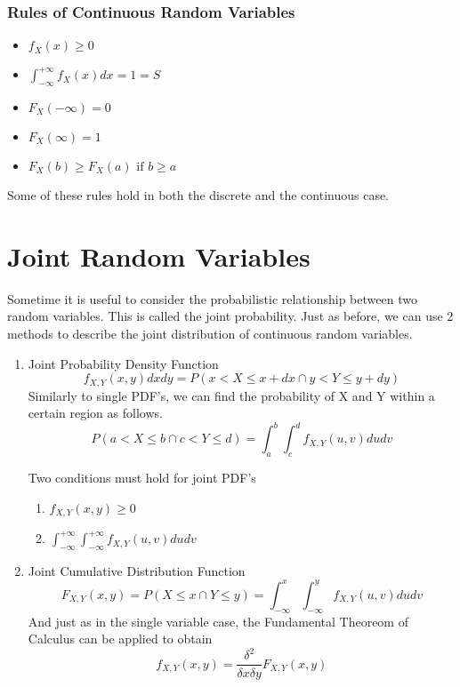 \subsubsection*{Rules of Continuous Random Variables}
\begin{itemize}
    \item $f_X(x) \ge 0$
    \item $\int_{-\infty}^{+\infty}f_X(x)dx = 1 = S$
    \item $F_X(-\infty) = 0$
    \item $F_X({}\infty) = 1$ 
    \item $F_X(b) \ge F_X(a) \text{ if } b \ge a$
\end{itemize}

Some of these rules hold in both the discrete and the continuous case.

\section{Joint Random Variables}

Sometime it is useful to consider the probabilistic relationship between two random variables. This is called the joint probability. Just as before, we can use 2 methods to describe the joint distribution of continuous random variables.
\begin{enumerate}
    \item Joint Probability Density Function
    \[
        f_{X,Y}(x, y)dxdy = P(x < X \le x + dx \cap y < Y \le y + dy) 
    \]
    Similarly to single PDF's, we can find the probability of X and Y within a certain region as follows.
    \[
        P(a < X \le b \cap c < Y \le d) = \int_a^b\int_c^d f_{X, Y}(u, v)dudv
    \]  

    Two conditions must hold for joint PDF's
    \begin{enumerate}
        \item $f_{X, Y}(x, y) \ge 0$
        \item $\int_{-\infty}^{+\infty}\int_{-\infty}^{+\infty} f_{X, Y}(u, v)dudv$
    \end{enumerate}

    \vspace{1cm}

    \item Joint Cumulative Distribution Function
    \[
        F_{X, Y}(x, y) = P(X \le x \cap Y \le y) = \int_{-\infty}^{x}\int_{-\infty}^y f_{X, Y}(u, v)dudv
    \]
    And just as in the single variable case, the Fundamental Theoreom of Calculus can be applied to obtain  
    \[
        f_{X,Y}(x, y) = \frac{\delta^2}{\delta x\delta y} F_{X,Y} (x, y)
    \]  
\end{enumerate}

